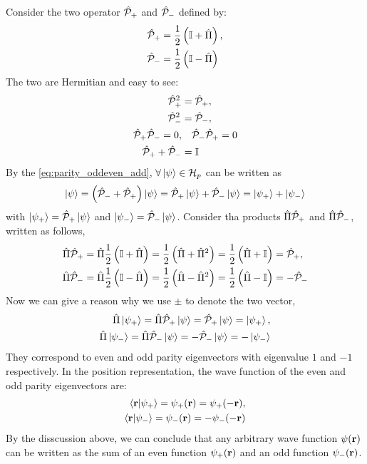 Consider the two operator $\hat{\mathcal{P}}_+$ and $\hat{\mathcal{P}}_-$ defined by: 
\begin{align}
    \hat{\mathcal{P}}_+ &= \frac{1}{2} \left( \mathbb{I} + \hat{\Pi} \right), \\
    \hat{\mathcal{P}}_- &= \frac{1}{2} \left( \mathbb{I} - \hat{\Pi} \right)
\end{align}
The two are Hermitian and easy to see: 
\begin{align}
    \hat{\mathcal{P}}_+^2 &= \hat{\mathcal{P}}_+, \\
    \hat{\mathcal{P}}_-^2 &= \hat{\mathcal{P}}_-, \\
    \hat{\mathcal{P}}_+ \hat{\mathcal{P}}_- = 0,& \quad \hat{\mathcal{P}}_- \hat{\mathcal{P}}_+ = 0 \\
    \hat{\mathcal{P}}_+ + \hat{\mathcal{P}}_- &= \mathbb{I} \label{eq:parity_oddeven_add}
\end{align}
By the \cref{eq:parity_oddeven_add}, $\forall \ket{\psi} \in \mathcal{H}_p$ can be written as 
\begin{align}
    \ket{\psi} = \left(\hat{\mathcal{P}}_- + \hat{\mathcal{P}}_+\right) \ket{\psi} = \hat{\mathcal{P}}_+ \ket{\psi} + \hat{\mathcal{P}}_- \ket{\psi} = \ket{\psi_+} + \ket{\psi_-}
\end{align} 
with $\ket{\psi_+} = \hat{\mathcal{P}}_+ \ket{\psi}$ and $\ket{\psi_-} = \hat{\mathcal{P}}_- \ket{\psi}$. Consider tha products $\hat{\Pi} \hat{\mathcal{P}}_+$ and $\hat{\Pi} \hat{\mathcal{P}}_-$, written as follows,
\begin{align}
    \hat{\Pi} \hat{\mathcal{P}}_+ &= \hat{\Pi} \frac{1}{2} \left( \mathbb{I} + \hat{\Pi} \right) = \frac{1}{2} \left( \hat{\Pi} + \hat{\Pi}^2 \right) = \frac{1}{2} \left( \hat{\Pi} + \mathbb{I} \right) = \hat{\mathcal{P}}_+, \\
    \hat{\Pi} \hat{\mathcal{P}}_- &= \hat{\Pi} \frac{1}{2} \left( \mathbb{I} - \hat{\Pi} \right) = \frac{1}{2} \left( \hat{\Pi} - \hat{\Pi}^2 \right) = \frac{1}{2} \left( \hat{\Pi} - \mathbb{I} \right) = -\hat{\mathcal{P}}_-
\end{align}
Now we can give a reason why we use $\pm$ to denote the two vector, 
\begin{align}
    \hat{\Pi} \ket{\psi_+} = \hat{\Pi} \hat{\mathcal{P}}_+ \ket{\psi} = \hat{\mathcal{P}}_+ \ket{\psi} = \ket{\psi_+}, \\
    \hat{\Pi} \ket{\psi_-} = \hat{\Pi} \hat{\mathcal{P}}_- \ket{\psi} = -\hat{\mathcal{P}}_- \ket{\psi} = -\ket{\psi_-}
\end{align}
They correspond to even and odd parity eigenvectors with eigenvalue $1$ and $-1$ respectively. In the position representation, the wave function of the even and odd parity eigenvectors are: 
\begin{align}
    \braket{\mathbf{r}|\psi_+} = \psi_+(\mathbf{r}) = \psi_+(-\mathbf{r}), \\
    \braket{\mathbf{r}|\psi_-} = \psi_-(\mathbf{r}) = -\psi_-(-\mathbf{r})
\end{align}
By the disscussion above, we can conclude that any arbitrary wave function $\psi(\mathbf{r})$ can be written as the sum of an even function $\psi_+(\mathbf{r})$ and an odd function $\psi_-(\mathbf{r})$. 

